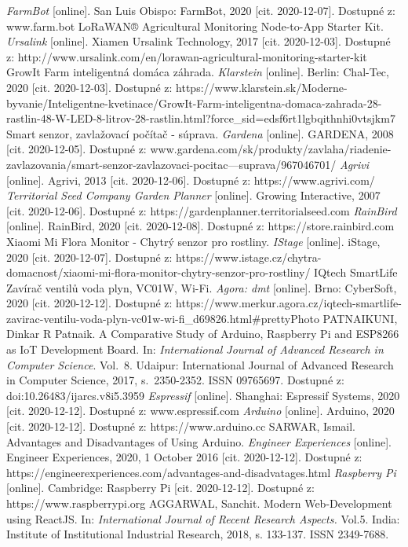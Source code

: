 \documentclass[twoside]{ctuthesis}
\theoremstyle{plain}
\theoremstyle{definition}
\theoremstyle{note}
\begin{document}
\begin{thebibliography}{46}
 \textit{FarmBot} [online]. San Luis Obispo: FarmBot, 2020 [cit. 2020-12-07]. Dostupné z: www.farm.bot
LoRaWAN® Agricultural Monitoring Node-to-App Starter Kit. \textit{Ursalink} [online]. Xiamen Ursalink Technology, 2017 [cit. 2020-12-03]. Dostupné z: http://www.ursalink.com/en/lorawan-agricultural-monitoring-starter-kit
GrowIt Farm inteligentná domáca záhrada. \textit{Klarstein} [online]. Berlin: Chal-Tec, 2020 [cit. 2020-12-03]. Dostupné z: https://www.klarstein.sk/Moderne-byvanie/Inteligentne-kvetinace/GrowIt-Farm-inteligentna-domaca-zahrada-28-rastlin-48-W-LED-8-litrov-28-rastlin.html?force\_sid=edsf6rt1lgbqithnhi0vtsjkm7
 Smart senzor, zavlažovací počítač - súprava. \textit{Gardena} [online]. GARDENA, 2008 [cit. 2020-12-05]. Dostupné z: www.gardena.com/sk/produkty/zavlaha/riadenie-zavlazovania/smart-senzor-zavlazovaci-pocitac---suprava/967046701/
 \textit{Agrivi} [online]. Agrivi, 2013 [cit. 2020-12-06]. Dostupné z: https://www.agrivi.com/
 \textit{Territorial Seed Company Garden Planner} [online]. Growing Interactive, 2007 [cit. 2020-12-06]. Dostupné z: https://gardenplanner.territorialseed.com
 \textit{RainBird} [online]. RainBird, 2020 [cit. 2020-12-08]. Dostupné z: https://store.rainbird.com
 Xiaomi Mi Flora Monitor - Chytrý senzor pro rostliny. \textit{IStage} [online]. iStage, 2020 [cit. 2020-12-07]. Dostupné z: https://www.istage.cz/chytra-domacnost/xiaomi-mi-flora-monitor-chytry-senzor-pro-rostliny/
IQtech SmartLife Zavírač ventilů voda plyn, VC01W, Wi-Fi. \textit{Agora: dmt} [online]. Brno: CyberSoft, 2020 [cit. 2020-12-12]. Dostupné z: https://www.merkur.agora.cz/iqtech-smartlife-zavirac-ventilu-voda-plyn-vc01w-wi-fi\_d69826.html\#prettyPhoto
 PATNAIKUNI, Dinkar R Patnaik. A Comparative Study of Arduino, Raspberry Pi and ESP8266 as IoT Development Board. In: \textit{International Journal of Advanced Research in Computer Science}. Vol.~8. Udaipur: International Journal of Advanced Research in Computer Science, 2017, s.~2350-2352. ISSN 09765697. Dostupné z: doi:10.26483/ijarcs.v8i5.3959
 \textit{Espressif} [online]. Shanghai: Espressif Systems, 2020 [cit. 2020-12-12]. Dostupné z: www.espressif.com
 \textit{Arduino} [online]. Arduino, 2020 [cit. 2020-12-12]. Dostupné z: https://www.arduino.cc
 SARWAR, Ismail. Advantages and Disadvantages of Using Arduino. \textit{Engineer Experiences} [online]. Engineer Experiences, 2020, 1 October 2016 [cit. 2020-12-12]. Dostupné z: https://engineerexperiences.com/advantages-and-disadvatages.html
 \textit{Raspberry Pi} [online]. Cambridge: Raspberry Pi [cit. 2020-12-12]. Dostupné z: https://www.raspberrypi.org
 AGGARWAL, Sanchit. Modern Web-Development using ReactJS. In:  \textit{International Journal of Recent Research Aspects.} Vol.5. India: Institute of Institutional Industrial Research, 2018, s. 133-137. ISSN 2349-7688.
\end{thebibliography}
\end{document}
